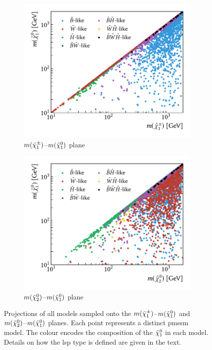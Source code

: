  \begin{figure}
	\centering
	\begin{subfigure}[b]{0.5\linewidth}
		\centering\includegraphics[width=\textwidth]{scatter/lsp_types.pdf}
		\vspace{-2.5em}
		\caption{$m(\tilde{\chi}_1^\pm)$--$m(\tilde{\chi}_1^0)$ plane\label{fig:lsp_types}}
	\end{subfigure}\hfill
	\begin{subfigure}[b]{0.5\linewidth}
		\centering\includegraphics[width=\textwidth]{scatter/lsp_types_N2.pdf}
		\vspace{-2.5em}
		\caption{$m(\tilde{\chi}_2^0)$--$m(\tilde{\chi}_1^0)$ plane\label{fig:lsp_types_N2}}
	\end{subfigure}\hfill
	\caption{Projections of all models sampled onto the  $m(\tilde{\chi}_1^\pm)$--$m(\tilde{\chi}_1^0)$ and  $m(\tilde{\chi}_2^0)$--$m(\tilde{\chi}_1^0)$ planes. Each point represents a distinct \gls{pmssm} model. The colour encodes the composition of the $\tilde{\chi}_1^0$ in each model. Details on how the \gls{lsp} type is defined are given in the text.}
	\label{fig:lsp_phenomenology}
\end{figure}

